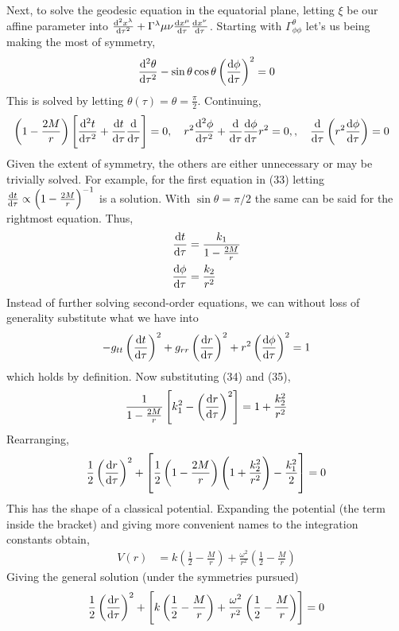 \documentclass[10pt]{scrartcl}
\begin{document}
Next, to solve the geodesic equation in the equatorial plane, letting $\xi$ be our affine parameter into $\dv[2]{x^{\lambda}}{\tau} + \Gamma^{\lambda}{\mu\nu}\dv{x^{\mu}}{\tau}\dv{x^{\nu}}{\tau}$. Starting with $\Gamma^{\theta}_{\phi\phi}$ let's us being making the most of symmetry,
\begin{align}
\dv[2]{\theta}{\tau} - \sin\theta\cos\theta\left(\dv{\phi}{\tau}\right)^2 = 0	
\end{align}
This is solved by letting $\theta(\tau)=\theta=\frac{\pi}{2}$. Continuing,
\begin{align}
&\left(1-\frac{2M}{r}\right)\left[\dv[2]{t}{\tau} + \dv{t}{\tau}\dv{\tau}\right] = 0 \qcomma r^2\dv[2]{\phi}{\tau} + \dv{\tau}\dv{\phi}{\tau}r^2 = 0,\qcomma \dv{\tau}\left(r^2\dv{\phi}{\tau}\right)=0
\end{align}
Given the extent of symmetry, the others are either unnecessary or may be trivially solved. For example, for the first equation in (33) letting $\dv{t}{\tau} \propto \left(1-\frac{2M}{r}\right)^{-1}$ is a solution. With $\sin{\theta}=\pi/2$ the same can be said for the rightmost equation. Thus,
\begin{align}
\dv{t}{\tau} &= \frac{k_1}{1-\frac{2M}{r}}\\
\dv{\phi}{\tau} &= \frac{k_2}{r^2}	
\end{align}
Instead of further solving second-order equations, we can without loss of generality substitute what we have into
\begin{align}
		-g_{tt}\left(\dv{t}{\tau}\right)^2 +g_{rr}\left(\dv{r}{\tau}\right)^2+r^2\left(\dv{\phi}{\tau}\right)^2 = 1
\end{align}
which holds by definition. Now substituting (34) and (35), 
\begin{align}
	\frac{1}{1-\frac{2M}{r}}\left[k_1^2 - \left(\dv{r}{\tau}\right)^2\right]  = 1+\frac{k_2^2}{r^2}
\end{align}
Rearranging,
\begin{align}
\frac{1}{2}\left(\dv{r}{\tau}\right)^2 + \left[\frac{1}{2}\left(1-\frac{2M}{r}\right)\left(1+\frac{k_2^2}{r^2}\right)- \frac{k_1^2}{2}\right] = 0
\end{align}
This has the shape of a classical potential.  Expanding the potential (the term inside the bracket) and giving more convenient names to the integration constants obtain,
\begin{align}
V(r) &= k\left(\frac{1}{2} - \frac{M}{r}\right) + \frac{\omega^2}{r^2}\left(\frac{1}{2}-\frac{M}{r}\right)	
\end{align}
Giving the general solution (under the symmetries pursued)
\begin{align}
\frac{1}{2}\left(\dv{r}{\tau}\right)^2 + \left[k\left(\frac{1}{2} - \frac{M}{r}\right) + \frac{\omega^2}{r^2}\left(\frac{1}{2}-\frac{M}{r}\right)\right] = 0	
\end{align}
\end{document}
